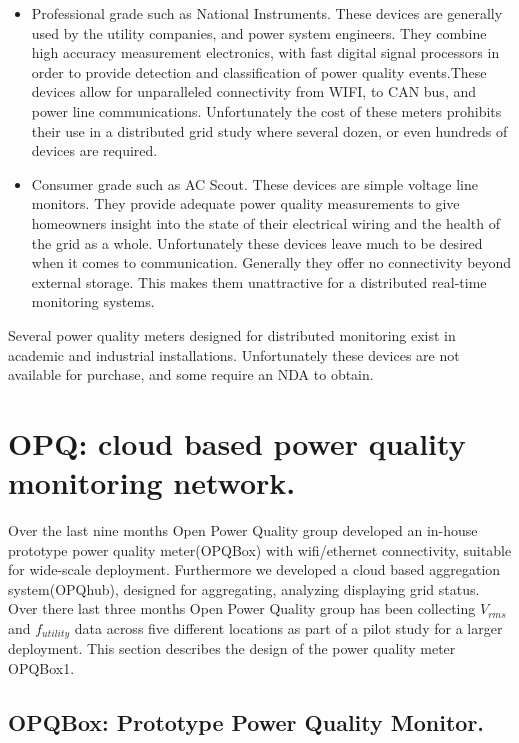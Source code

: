 \begin{itemize}
\item Professional grade such as National Instruments. These devices are generally used by the utility companies, and power system engineers. They combine high accuracy measurement electronics, with fast digital signal processors in order to provide detection and classification of power quality events.These devices allow for unparalleled connectivity from WIFI, to CAN bus, and power line communications.  Unfortunately the cost of these meters prohibits their use in a distributed grid study where several dozen, or even hundreds of devices are required.
\item Consumer grade such as AC Scout\textregistered. These devices are simple voltage line monitors. They provide adequate power quality measurements to give homeowners insight into the state of their electrical wiring and the health of the grid as a whole. Unfortunately these devices leave much to be desired when it comes to communication. Generally they offer no connectivity beyond external storage. This makes them unattractive for a distributed real-time monitoring systems.
\end{itemize}

Several power quality meters designed for distributed monitoring exist in academic and industrial installations.\cite{fnet_main} Unfortunately these devices are not available for purchase, and some require an NDA to obtain.

\section{OPQ: cloud based power quality monitoring network.}

Over the last nine months Open Power Quality group developed an in-house prototype power quality meter(OPQBox) with wifi/ethernet connectivity, suitable for wide-scale deployment. Furthermore we developed a cloud based aggregation system(OPQhub), designed for aggregating, analyzing displaying grid status. Over there last three months Open Power Quality group has been collecting $V_{rms}$ and $f_{utility}$ data across five different locations as part of a pilot study for a larger deployment. This section describes the design of the power quality meter OPQBox1.

\subsection{OPQBox: Prototype Power Quality Monitor.}

